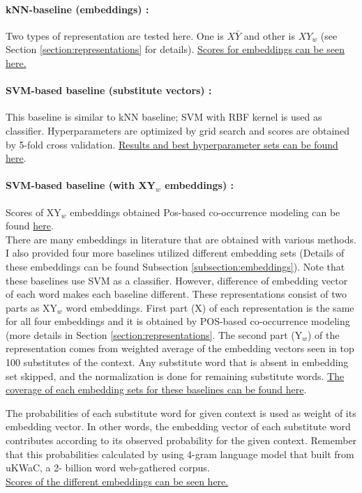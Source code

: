\paragraph{kNN-baseline (embeddings) :} Two types of representation are tested here. One is $X\bar{Y}$ and other is $XY_w$ (see Section \ref{section:representations} for details). \href{https://goo.gl/010sp5}{Scores for embeddings can be seen here.} 
\paragraph{SVM-based baseline (substitute vectors) :} This baseline is similar to kNN baseline; SVM with RBF kernel is used as classifier. Hyperparameters are optimized by grid search and scores are obtained by 5-fold cross validation. \href{https://goo.gl/i43T1U}{Results and best hyperparameter sets can be found here}.
\paragraph{SVM-based baseline (with XY$_w$ embeddings) :} Scores of XY$_w$ embeddings obtained Pos-based co-occurrence modeling can be found \href{https://goo.gl/Zofhfm}{here}. \\


There are many embeddings in literature that are obtained with various methods. I also provided four more baselines utilized different embedding sets (Details of these embeddings can be found Subsection \ref{subsection:embeddings}). Note that these baselines use SVM as a classifier. However, difference of embedding vector of each word makes each baseline different. These representations consist of two parts as XY$_w$ word embeddings. First part (X) of each representation is the same for all four embeddings and it is obtained by POS-based co-occurrence modeling (more details in Section \ref{section:representations}. The second part (Y$_w$) of the representation comes from weighted average of the embedding vectors seen in top 100 substitutes of the context. Any substitute word that is absent in embedding set skipped, and the normalization is done for remaining substitute words. \href{https://goo.gl/Tcym7B}{The coverage of each embedding sets for these baselines can be found here}.

The probabilities of each substitute word for given context is used as weight of its embedding vector. In other words, the embedding vector of each substitute word contributes according to its observed probability for the given context. Remember that this probabilities calculated by using 4-gram language model that built from uKWaC, a 2- billion word web-gathered corpus.  \\

\href{https://goo.gl/Tcym7B}{Scores of the different embeddings can be seen here.}

